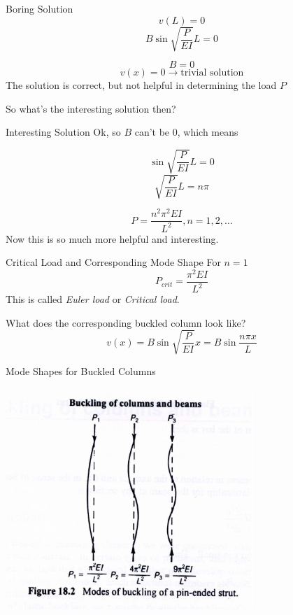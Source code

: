 \documentclass[10pt, svgnames]{beamer}
\begin{document}
\begin{frame}[label={sec:orgc2f95ef}]{Boring Solution}
$$ v(L) = 0 $$
$$ B \sin \sqrt{\frac{P}{EI}} L = 0 $$

$$ B = 0 $$
$$ v(x) = 0 \rightarrow \text{trivial solution} $$
The solution is correct, but not helpful in determining the load \(P\)

So what's the interesting solution then?
\end{frame}

\begin{frame}[label={sec:org22ca330}]{Interesting Solution}
Ok, so \(B\) can't be 0, which means

$$  \sin  \sqrt{\frac{P}{EI}}   L = 0  $$
$$  \sqrt{\frac{P}{EI}}   L = n\pi $$

$$ P = \dfrac{n^2 \pi^2 E I}{L^2}, n = 1, 2, \dots $$
Now this is so much more helpful and interesting.
\end{frame}

\begin{frame}[label={sec:org912ee52}]{Critical Load and Corresponding Mode Shape}
For \(n = 1\)
$$ P_{crit} = \dfrac{\pi^2 E I}{L^2} $$
This is called \emph{Euler load} or \emph{Critical load}.

What does the corresponding buckled column look like?
$$ v(x) = B \sin \sqrt{\frac{P}{EI}}   x = B \sin \dfrac{n \pi x}{L} $$
\end{frame}

\begin{frame}[label={sec:org42a7199}]{Mode Shapes for Buckled Columns}
\begin{center}
\includegraphics[width=0.7\textwidth]{pictures/buckling-mode.pdf}
\end{center}
\end{frame}
\end{document}
